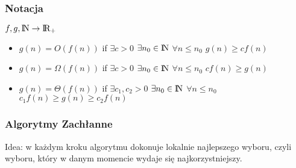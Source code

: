 \subsubsection{Notacja}
\(f,g,{\rm I\!N} \rightarrow {\rm I\!R}_+\)
\begin{itemize}
	\item \( g(n) = O(f(n))\) if \(\exists{c}>0\) \(\exists{n_0}\in {\rm I\!N} \) \(\forall{n} \leq n_0\) \(g(n) \geq c f(n)\)
    \item \( g(n) = \Omega(f(n))\) if \(\exists{c}>0\) \(\exists{n_0}\in {\rm I\!N} \) \(\forall{n} \leq n_0\) \(cf(n) \geq g(n)\)
    \item \( g(n) = \Theta(f(n))\) if \(\exists{c_1,c_2}>0\) \(\exists{n_0}\in {\rm I\!N} \) \(\forall{n} \leq n_0\) \(c_1 f(n)\geq g(n) \geq c_2 f(n)\)
\end{itemize}
\subsubsection{Algorytmy Zachłanne}
Idea: w każdym kroku algorytmu dokonuje lokalnie najlepszego wyboru, czyli wyboru, który w danym momencie wydaje się najkorzystniejszy.